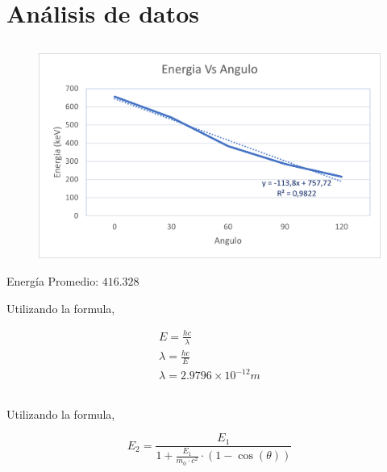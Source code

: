 \documentclass[letterpaper, 12pt]{article}
\begin{document}
\section{Análisis de datos}

\subsection{}

\begin{figure}[H]
      \begin{center}
            \includegraphics[width=.8\linewidth]{./Images/Graph.Analisis_1.png}
            \caption{}
      \end{center}
\end{figure}

Energía Promedio: $416.328$

Utilizando la formula,

\begin{equation*}
      \begin{gathered}
            E = \frac{h c}{\lambda} \\
            \lambda = \frac{h c}{E} \\
            \lambda = 2.9796 \times 10^{-12} m
      \end{gathered}
\end{equation*}

\subsection{}

Utilizando la formula,

\begin{equation}
      E_{2} = \frac{E_{1}}{1 + \frac{E_{1}}{m_0 \cdot c^{2}} \cdot (1 - \cos(\theta))}
      \label{eq:E2}
\end{equation}
\end{document}
